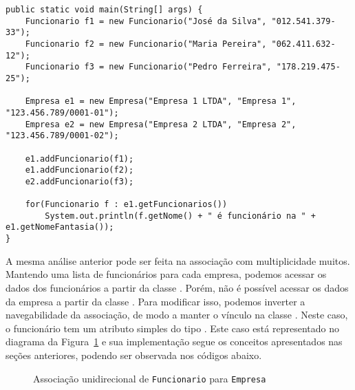 \begin{verbatim}
public static void main(String[] args) {
	Funcionario f1 = new Funcionario("José da Silva", "012.541.379-33");
	Funcionario f2 = new Funcionario("Maria Pereira", "062.411.632-12");
	Funcionario f3 = new Funcionario("Pedro Ferreira", "178.219.475-25");
	
	Empresa e1 = new Empresa("Empresa 1 LTDA", "Empresa 1", "123.456.789/0001-01");
	Empresa e2 = new Empresa("Empresa 2 LTDA", "Empresa 2", "123.456.789/0001-02");
	
	e1.addFuncionario(f1);
	e1.addFuncionario(f2);
	e2.addFuncionario(f3);
	
	for(Funcionario f : e1.getFuncionarios())
		System.out.println(f.getNome() + " é funcionário na " + e1.getNomeFantasia());
}
\end{verbatim}

A mesma análise anterior pode ser feita na associação com multiplicidade muitos. Mantendo uma lista de funcionários para cada empresa, podemos acessar os dados dos funcionários a partir da classe . Porém, não é possível acessar os dados da empresa a partir da classe . Para modificar isso, podemos inverter a navegabilidade da associação, de modo a manter o vínculo na classe . Neste caso, o funcionário tem um atributo simples do tipo . Este caso está representado no diagrama da Figura~\ref{fig:associacao-muitos-uni-funcionario} e sua implementação segue os conceitos apresentados nas seções anteriores, podendo ser observada nos códigos abaixo.

\begin{figure}[h]
	\centering
	
	
	\caption{Associação unidirecional de \texttt{Funcionario} para \texttt{Empresa}}
	\label{fig:associacao-muitos-uni-funcionario}
\end{figure}

